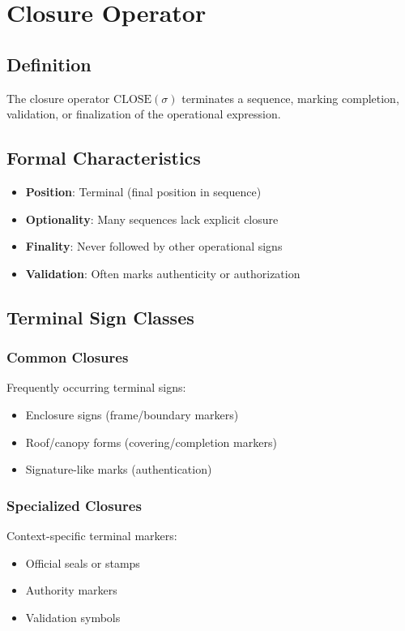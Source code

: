 \section{Closure Operator}

\subsection{Definition}

The closure operator $\text{CLOSE}(\sigma)$ terminates a sequence, marking completion, validation, or finalization of the operational expression.

\subsection{Formal Characteristics}

\begin{itemize}
    \item \textbf{Position}: Terminal (final position in sequence)
    \item \textbf{Optionality}: Many sequences lack explicit closure
    \item \textbf{Finality}: Never followed by other operational signs
    \item \textbf{Validation}: Often marks authenticity or authorization
\end{itemize}

\subsection{Terminal Sign Classes}

\subsubsection{Common Closures}
Frequently occurring terminal signs:
\begin{itemize}
    \item Enclosure signs (frame/boundary markers)
    \item Roof/canopy forms (covering/completion markers)
    \item Signature-like marks (authentication)
\end{itemize}

\subsubsection{Specialized Closures}
Context-specific terminal markers:
\begin{itemize}
    \item Official seals or stamps
    \item Authority markers
    \item Validation symbols
\end{itemize}

